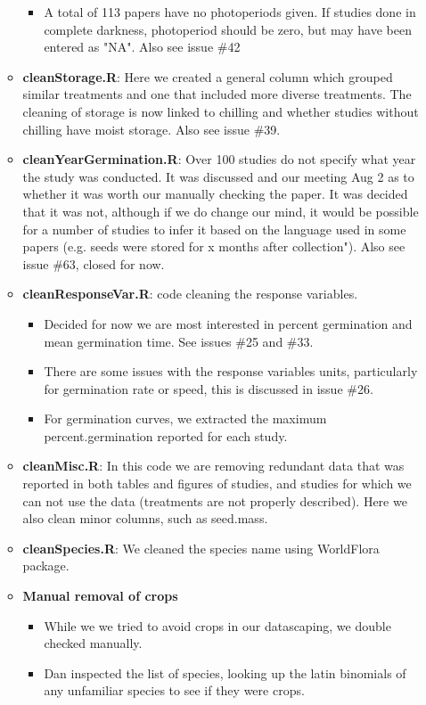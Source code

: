 \documentclass{article}[12pt]
\begin{document}
\begin{enumerate}
\begin{itemize}
\begin{itemize}
\item A total of 113 papers have no photoperiods given. If studies done in complete darkness, photoperiod should be zero, but may have been entered as "NA". Also see issue \#42
\end{itemize}
\item \textbf{cleanStorage.R}: Here we created a general column which grouped similar treatments and one that included more diverse treatments. The cleaning of storage is now linked to chilling and whether studies without chilling have moist storage. Also see issue \#39.
\item \textbf{cleanYearGermination.R}: Over 100 studies do not specify what year the study was conducted. It was discussed and our meeting Aug 2 as to whether it was worth our manually checking the paper. It was decided that it was not, although if we do change our mind, it would be possible for a number of studies to infer it based on the language used in some papers (e.g. seeds were stored for x months after collection"). Also see issue \#63, closed for now.
\item \textbf{cleanResponseVar.R}: code cleaning the response variables. 
\begin{itemize}
\item Decided for now we are most interested in percent germination and mean germination time. See issues \#25 and \#33.
\item There are some issues with the response variables units, particularly for germination rate or speed, this is discussed in issue \#26.
\item For germination curves, we extracted the maximum percent.germination reported for each study.
\end{itemize}
\item \textbf{cleanMisc.R}: In this code we are removing redundant data that was reported in both tables and figures of studies, and studies for which we can not use the data (treatments are not properly described). Here we also clean minor columns, such as seed.mass. 
\item \textbf{cleanSpecies.R}: We cleaned the species name using WorldFlora package.
\end{itemize}
\begin{itemize}
\item\textbf{Manual removal of crops}
\begin{itemize}
\item While we we tried to avoid crops in our datascaping, we double checked manually.
\item Dan inspected the list of species, looking up the latin binomials of any unfamiliar species to see if they were crops.

\end{itemize}
\end{itemize}
\end{enumerate}
\end{document}
